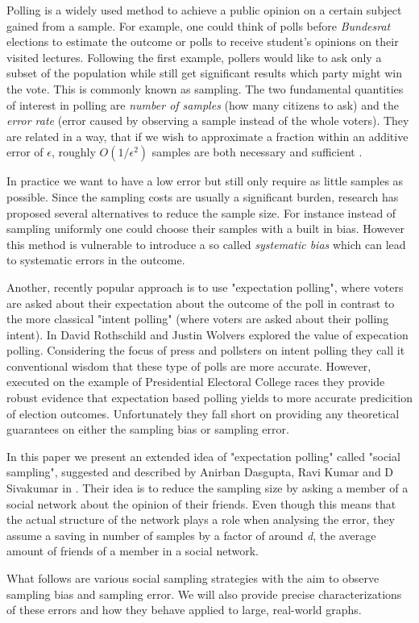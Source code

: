 Polling is a widely used method to achieve a public opinion on a certain subject gained from a sample. For example, one could think of polls before \textit{Bundesrat} elections to estimate the outcome or polls to receive student's opinions on their visited lectures.
Following the first example, pollers would like to ask only a subset of the population while still get significant results which party might win the vote. This is commonly known as sampling.
The two fundamental quantities of interest in polling are \textit{number of samples} (how many citizens to ask) and the \textit{error rate} (error caused by observing a sample instead of the whole voters). They are related in a way, that if we wish to approximate a fraction within an additive error of $\epsilon$, roughly $O(1/\epsilon^{2})$ samples are both necessary and sufficient .

In practice we want to have a low error but still only require as little samples as possible.
Since the sampling costs are usually a significant burden, research has proposed several alternatives to reduce the sample size.
For instance instead of sampling uniformly one could choose their samples with a built in bias.
However this method is vulnerable to introduce a so called \textit{systematic bias} which can lead to systematic errors in the outcome.

Another, recently popular approach is to use "expectation polling", where voters are asked about their expectation about the outcome of the poll in contrast to the more classical "intent polling" (where voters are asked about their polling intent). In \cite{rothschild2009forecasting} David Rothschild and Justin Wolvers explored the value of expecation polling. Considering the focus of press and pollsters on intent polling they call it conventional wisdom that these type of polls are more accurate. However, executed on the example of Presidential Electoral College races they provide robust evidence that expectation based polling yields to more accurate predicition of election outcomes.
Unfortunately they fall short on providing any theoretical guarantees on either the sampling bias or sampling error.

In this paper we present an extended idea of "expectation polling" called "social sampling", suggested and described by Anirban Dasgupta, Ravi Kumar and D Sivakumar in \cite{dasgupta2012social}.
Their idea is to reduce the sampling size by asking a member of a social network about the opinion of their friends.
Even though this means that the actual structure of the network plays a role when analysing the error, they assume a saving in number of samples by a factor of around \textit{d}, the average amount of friends of a member in a social network.

What follows are various social sampling strategies with the aim to observe sampling bias and sampling error.
We will also provide precise characterizations of these errors and how they behave applied to large, real-world graphs.
